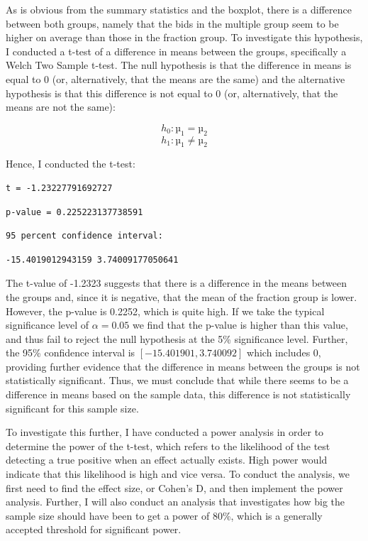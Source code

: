\documentclass[
]{report}
\begin{document}
As is obvious from the summary statistics and the boxplot, there is a
difference between both groups, namely that the bids in the multiple
group seem to be higher on average than those in the fraction group. To
investigate this hypothesis, I conducted a t-test of a difference in
means between the groups, specifically a Welch Two Sample t-test. The
null hypothesis is that the difference in means is equal to 0 (or,
alternatively, that the means are the same) and the alternative
hypothesis is that this difference is not equal to 0 (or, alternatively,
that the means are not the same):

\[h_0: µ_1 = µ_2\] \[h_1: µ_1 ≠ µ_2\]

Hence, I conducted the t-test:

\begin{verbatim}
t = -1.23227791692727 
\end{verbatim}

\begin{verbatim}
p-value = 0.225223137738591
\end{verbatim}

\begin{verbatim}
95 percent confidence interval: 
\end{verbatim}

\begin{verbatim}
-15.4019012943159 3.74009177050641
\end{verbatim}

The t-value of -1.2323 suggests that there is a difference in the means
between the groups and, since it is negative, that the mean of the
fraction group is lower. However, the p-value is 0.2252, which is quite
high. If we take the typical significance level of \(α = 0.05\) we find
that the p-value is higher than this value, and thus fail to reject the
null hypothesis at the 5\% significance level. Further, the 95\%
confidence interval is \([-15.401901, 3.740092]\) which includes 0,
providing further evidence that the difference in means between the
groups is not statistically significant. Thus, we must conclude that
while there seems to be a difference in means based on the sample data,
this difference is not statistically significant for this sample size.

To investigate this further, I have conducted a power analysis in order
to determine the power of the t-test, which refers to the likelihood of
the test detecting a true positive when an effect actually exists. High
power would indicate that this likelihood is high and vice versa. To
conduct the analysis, we first need to find the effect size, or Cohen's
D, and then implement the power analysis. Further, I will also conduct
an analysis that investigates how big the sample size should have been
to get a power of 80\%, which is a generally accepted threshold for
significant power.
\end{document}
